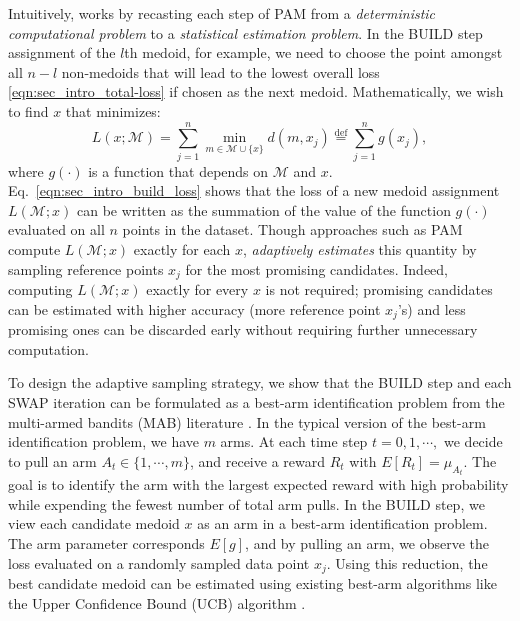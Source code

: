 Intuitively, \algname works by recasting each step of PAM from a \emph{deterministic computational problem} to a \emph{statistical estimation problem}. 
In the BUILD step assignment of the $l$th medoid, for example, we need to choose the point amongst all $n-l$ non-medoids that will lead to the lowest overall loss \eqref{eqn:sec_intro_total-loss} if chosen as the next medoid. Mathematically, we wish to find $x$ that minimizes:
\begin{equation} \label{eqn:sec_intro_build_loss}
	L(x; \mathcal{M}) = \sum_{j=1}^n \min_{m \in \mathcal{M} \cup \{x\}} d(m, x_j) \overset{\text{def}}{=} \sum_{j=1}^n g(x_j),
\end{equation}
where $g(\cdot)$ is a function that depends on $\mathcal{M}$ and $x$.
Eq.~\eqref{eqn:sec_intro_build_loss} shows that the loss of a new medoid assignment $L(\mathcal{M}; x)$ can be written as the summation of the value of the function $g(\cdot)$ evaluated on all $n$ points in the dataset. Though approaches such as PAM compute $L(\mathcal{M}; x)$ exactly for each $x$, \algname \textit{adaptively estimates} this quantity by sampling reference points $x_j$ for the most promising candidates. Indeed, computing $L(\mathcal{M}; x)$ exactly for every $x$ is not required; promising candidates can be estimated with higher accuracy (more reference point $x_j$'s) and less promising ones can be discarded early without requiring further unnecessary computation.

To design the adaptive sampling strategy, we show that the BUILD step and each SWAP iteration can be formulated as a best-arm identification problem from the multi-armed bandits (MAB) literature \cite{audibert2010best,even2002pac,jamieson2014lil,jamieson2014best}. 
In the typical version of the best-arm identification problem, we have $m$ arms. At each time step $t = 0,1,\cdots,$ we decide to pull an arm $A_t\in \{1,\cdots,m\}$, and receive a reward $R_t$ with $E[R_t] = \mu_{A_t}$. The goal is to identify the arm with the largest expected reward with high probability while expending the fewest number of total arm pulls.
In the BUILD step, we view each candidate medoid $x$ as an arm in a best-arm identification problem. The arm parameter corresponds $E[g]$, and by pulling an arm, we observe the loss evaluated on a randomly sampled data point $x_j$. Using this reduction, the best candidate medoid can be estimated using existing best-arm algorithms like the Upper Confidence Bound (UCB) algorithm \cite{lai1985asymptotically}.


